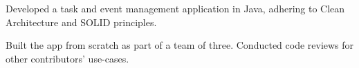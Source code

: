 \documentclass[letterpaper,10pt]{article}
\begin{document}
    \begin{resume_list}
        \item Developed a task and event management application in Java, adhering to Clean Architecture and SOLID principles.
        \item Built the app from scratch as part of a team of three. Conducted code reviews for other contributors' use-cases.
    \end{resume_list}

    
\end{document}
